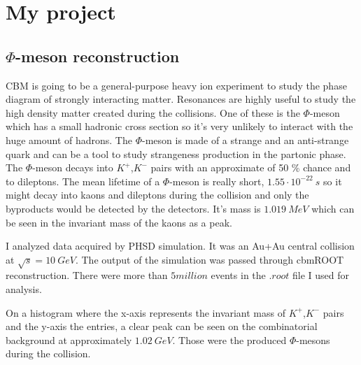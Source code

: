 \documentclass[a4paper,12pt]{article}
\begin{document}
\section{My project}
\subsection{$\Phi$-meson reconstruction}
\vspace{3mm}
\par CBM is going to be a general-purpose heavy ion experiment to study the phase diagram of strongly interacting matter. Resonances are highly useful to study the high density matter created during the collisions. One of these is the $\Phi$-meson which has a small hadronic cross section so  it's  very unlikely to interact with the huge amount of hadrons. The $\Phi$-meson is made of a strange and an anti-strange quark and can be a tool to study strangeness production in the partonic phase. The $\Phi$-meson decays into $K^{+}$,$K^{-}$ pairs with an approximate of 50 \% chance and to dileptons. The mean lifetime of a $\Phi$-meson is really short, $1.55\cdot10^{-22}~s$ so it might decay into kaons and dileptons during the collision and only the byproducts would be detected by the detectors. It's mass is $1.019~MeV$ which can be seen in the invariant mass of the kaons as a peak.
\vspace{3mm}
\par I analyzed data acquired by PHSD simulation. It was an Au+Au central collision at $\sqrt{s} = 10~GeV$. The output of the simulation was passed through cbmROOT reconstruction. There were more than $5 million$ events in the $.root$ file I used for analysis.
\vspace{3mm}
\par On a histogram where the x-axis represents the invariant mass of $K^{+}$,$K^{-}$ pairs and the y-axis the entries, a clear peak can be seen on the combinatorial background at approximately $1.02~GeV$. Those were the produced $\Phi$-mesons during the collision.
\end{document}
